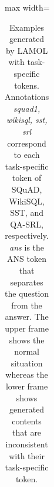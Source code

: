 \begin{table}[h]
\begin{threeparttable}
\begin{adjustbox}{max width=\textwidth}
\begin{tabular}{|m{50em}|}
    \\
    \\
    \hline
    \end{tabular}
    \end{adjustbox}
    \caption{Examples generated by LAMOL with task-specific tokens. Annotations \textit{\textunderscore \textunderscore squad1\textunderscore \textunderscore, \textunderscore \textunderscore wikisql\textunderscore \textunderscore, \textunderscore \textunderscore sst\textunderscore \textunderscore, \textunderscore \textunderscore srl\textunderscore \textunderscore} correspond to each task-specific token of SQuAD, WikiSQL, SST, and QA-SRL, respectively. \textit{\textunderscore \textunderscore ans\textunderscore \textunderscore} is the ANS token that separates the question from the answer. The upper frame shows the normal situation whereas the lower frame shows generated contents that are inconsistent with their task-specific token.}
\label{tab:gen_ex}
\end{threeparttable}
\end{table}
